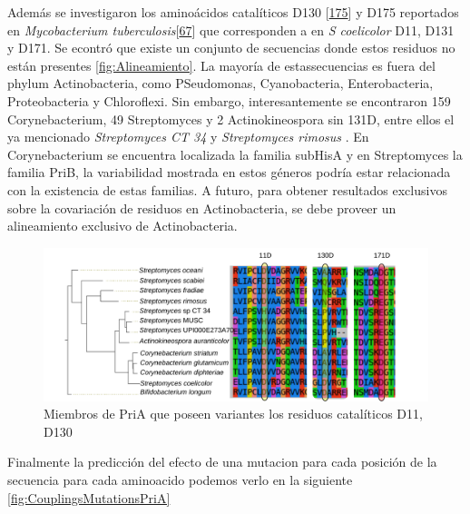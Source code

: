 \documentclass[12pt,twoside]{reedthesis}
\begin{document}
  Además se investigaron los aminoácidos catalíticos D130
  {[}\protect\hyperlink{ref-due_bisubstrate_2011}{175}{]} y D175
  reportados en \emph{Mycobacterium
  tuberculosis}{[}\protect\hyperlink{ref-verduzco-castro_co-occurrence_2016}{67}{]}
  que corresponden a en \emph{S coelicolor} D11, D131 y D171. Se econtró
  que existe un conjunto de secuencias donde estos residuos no están
  presentes \autoref{fig:Alineamiento}. La mayoría de estassecuencias es
  fuera del phylum Actinobacteria, como PSeudomonas, Cyanobacteria,
  Enterobacteria, Proteobacteria y Chloroflexi. Sin embargo,
  interesantemente se encontraron 159 Corynebacterium, 49 Streptomyces y 2
  Actinokineospora sin 131D, entre ellos el ya mencionado
  \emph{Streptomyces CT 34} y \emph{Streptomyces rimosus} . En
  Corynebacterium se encuentra localizada la familia subHisA y en
  Streptomyces la familia PriB, la variabilidad mostrada en estos géneros
  podría estar relacionada con la existencia de estas familias. A futuro,
  para obtener resultados exclusivos sobre la covariación de residuos en
  Actinobacteria, se debe proveer un alineamiento exclusivo de
  Actinobacteria.
  
  \begin{figure}[h!tbp]
  \centering
  \includegraphics[angle = 0,scale = .5]{chapter4/Couplings/HIS4_STRCO_1-200/align/alineamiento.pdf}
  \caption[Miembros de PriA que poseen variantes los residuos catalíticos D11, D130]{\footnotesize{Miembros de PriA que poseen variantes los residuos catalíticos D11, D130}}
  \label{fig:Alineamiento}
  \end{figure}
  
  Finalmente la predicción del efecto de una mutacion para cada posición
  de la secuencia para cada aminoacido podemos verlo en la siguiente
  \autoref{fig:CouplingsMutationsPriA}
  
\end{document}
